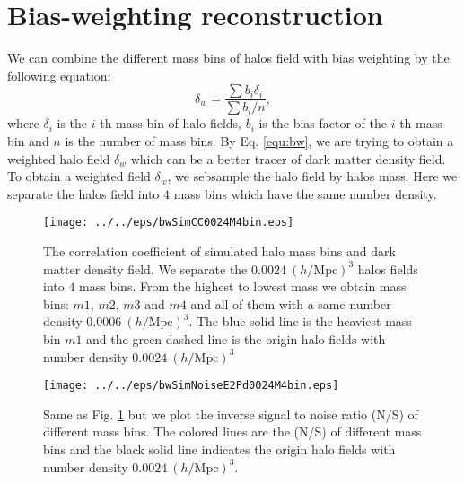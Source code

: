 \section{Bias-weighting reconstruction}
We can combine the different mass bins of halos field 
with bias weighting by the following equation:
\begin{equation}
\delta_{w}=\frac{\sum b_{i}\delta_{i}}{\sum b_{i}/n},
\label{equ:bw}
\end{equation}
where $\delta_{i}$ is the $i$-th mass bin of halo fields, $b_{i}$ is the 
bias factor of the $i$-th mass bin and $n$ is the number of mass bins.
 By Eq. \eqref{equ:bw}, we are trying to
obtain a weighted halo field $\delta_{w}$ which can be a better tracer of 
dark matter density field.\\
To obtain a weighted field $\delta_{w}$, we sebsample the halo field by halos
mass. Here we separate the halos field into $4$ mass bins which have the same
number density.\\
\begin{figure}[tbp]
\begin{center}
\texttt{[image: ../../eps/bwSimCC0024M4bin.eps]}
\end{center}
\vspace{-0.7cm}
\caption{The correlation coefficient of simulated halo mass bins 
and dark matter density
field. We separate the $0.0024\ (h/\mathrm{Mpc})^3$ halos fields into $4$ 
mass bins. From the highest to lowest mass we obtain mass bins: 
$m1$, $m2$, $m3$ and $m4$ and all of them with a same number density
$0.0006\ (h/\mathrm{Mpc})^3$. The blue solid line is the heaviest mass bin
 $m1$ and the green dashed line is the origin halo fields with number density
 $0.0024\ (h/\mathrm{Mpc})^3$}
\label{fig:bw_CC}
\end{figure}
\begin{figure}[tbp]
\begin{center}
\texttt{[image: ../../eps/bwSimNoiseE2Pd0024M4bin.eps]}
\end{center}
\vspace{-0.7cm}
\caption{Same as Fig. \ref{fig:bw_CC} but we plot 
the inverse signal to noise ratio (N/S) of different mass bins. 
The colored lines are the (N/S) of different mass bins and the black solid 
line  indicates the origin halo fields with number density
 $0.0024\ (h/\mathrm{Mpc})^3$.
}
\label{fig:bw_noise}
\end{figure}
